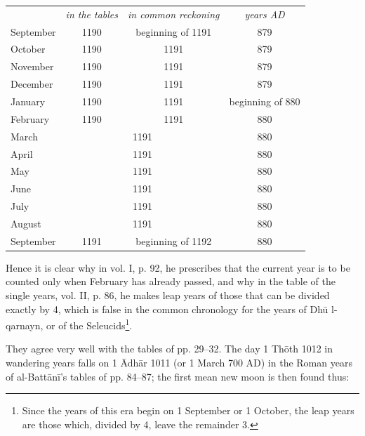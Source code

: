 \documentclass[11pt]{article}
\newcommand{\Pg}[1]{\marginpar{\footnotesize\color{gray}#1}}
\begin{document}
\begin{center}\small\begin{tabular}{lccc}
 & \emph{in the tables} & \emph{in common reckoning} & \emph{years AD} \\
September & 1190 & beginning of 1191 & 879 \\
October & 1190 & 1191 & 879 \\
November & 1190 & 1191 & 879 \\
December & 1190 & 1191 & 879 \\
January & 1190 & 1191 & beginning of 880 \\
February & 1190 & 1191 & 880 \\
March & \multicolumn{2}{c}{1191} & 880 \\
April & \multicolumn{2}{c}{1191} & 880 \\
May & \multicolumn{2}{c}{1191} & 880 \\
June & \multicolumn{2}{c}{1191} & 880 \\
July & \multicolumn{2}{c}{1191} & 880 \\
August & \multicolumn{2}{c}{1191} & 880 \\
September & 1191 & beginning of 1192 & 880 \\
\end{tabular}\end{center}
\par Hence it is clear why in vol. I, p. 92, he prescribes that the current year is to be counted only when February has already passed, and why in the table of the single years, vol. II, p. 86, he makes leap years of those that can be divided exactly by 4, which is false in the common chronology for the years of Dhū l-qarnayn, or of the Seleucids\footnote{Since the years of this era begin on 1 September or 1 October, the leap years are those which, divided by 4, leave the remainder 3.}.\par
\par \Pg{II 228}They agree very well with the tables of pp. 29–32. The day 1 Thōth 1012 in wandering years falls on 1 Ādhār 1011 (or 1 March 700 AD) in the Roman years of al-Battānī's tables of pp. 84–87; the first mean new moon is then found thus:\par
\end{document}
